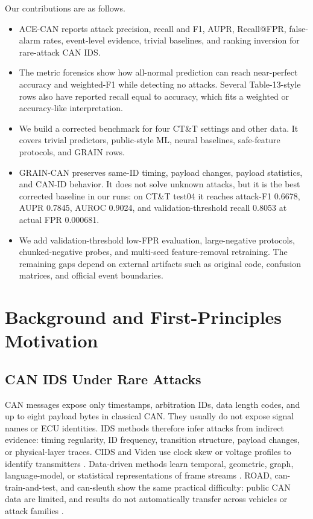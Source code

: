 \documentclass[runningheads]{llncs}%
\newcommand{\method}{GRAIN-CAN}
\newcommand{\framework}{ACE-CAN}
\begin{document}
Our contributions are as follows.
\begin{itemize}
    \item \framework{} reports attack precision, recall and F1, AUPR, Recall@FPR, false-alarm rates, event-level evidence, trivial baselines, and ranking inversion for rare-attack CAN IDS.
    \item The metric forensics show how all-normal prediction can reach near-perfect accuracy and weighted-F1 while detecting no attacks.  Several Table-13-style rows also have reported recall equal to accuracy, which fits a weighted or accuracy-like interpretation.
    \item We build a corrected benchmark for four CT\&T settings and other data.  It covers trivial predictors, public-style ML, neural baselines, safe-feature protocols, and GRAIN rows.
    \item \method{} preserves same-ID timing, payload changes, payload statistics, and CAN-ID behavior.  It does not solve unknown attacks, but it is the best corrected baseline in our runs: on CT\&T test04 it reaches attack-F1 0.6678, AUPR 0.7845, AUROC 0.9024, and validation-threshold recall 0.8053 at actual FPR 0.000681.
    \item We add validation-threshold low-FPR evaluation, large-negative protocols, chunked-negative probes, and multi-seed feature-removal retraining.  The remaining gaps depend on external artifacts such as original code, confusion matrices, and official event boundaries.
\end{itemize}

\section{Background and First-Principles Motivation}
\subsection{CAN IDS Under Rare Attacks}
CAN messages expose only timestamps, arbitration IDs, data length codes, and up to eight payload bytes in classical CAN.  They usually do not expose signal names or ECU identities.  IDS methods therefore infer attacks from indirect evidence: timing regularity, ID frequency, transition structure, payload changes, or physical-layer traces.  CIDS and Viden use clock skew or voltage profiles to identify transmitters \cite{cho2016fingerprinting,cho2017viden}.  Data-driven methods learn temporal, geometric, graph, language-model, or statistical representations of frame streams \cite{tyree2018shape,verma2020road,alkhatib2022canbert,wang2023statgraph}.  ROAD, can-train-and-test, and can-sleuth show the same practical difficulty: public CAN data are limited, and results do not automatically transfer across vehicles or attack families \cite{verma2020road,lampe2024ctt,kidmose2025cansleuth}.
\end{document}
